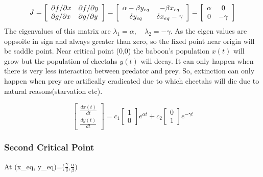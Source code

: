 \documentclass[12pt]{article}
\begin{document}
\begin{equation*}
J = \left[ \begin{array} { l l } \partial f / \partial x & \partial f / \partial y \\ \partial g / \partial x & \partial g / \partial y \end{array} \right] = \left[ \begin{array} { c c } \alpha - \beta y_{eq} & - \beta x_{eq} \\ \delta y_{eq} & \delta x_{eq} - \gamma \end{array} \right] = \left[ \begin{array} { c c } \alpha & 0 \\ 0 & - \gamma \end{array} \right]
    
\end{equation*}
The eigenvalues of this matrix are $ \lambda _ { 1 } = \alpha , \quad \lambda _ { 2 } = - \gamma $. As the eigen values are oppsoite in sign and always greater than zero, so the fixed point near origin will be saddle point. Near critical point (0,0) the baboon's population $ x ( t ) $ will grow but the population of cheetahs $y(t)$ will decay. It can only happen when there is very less interaction between predator and prey. So, extinction can only happen when prey are artifically eradicated due to which cheetahs will die due to natural reasons(starvation etc).

\begin{equation*}
    \left[\begin{array} { c } \frac { d x ( t ) } { d t } \\ \frac { d y ( t ) } { d t } \end{array} \right] = c _ { 1 } \left[ \begin{array} { l } 1 \\ 0 \end{array} \right] e ^ { \alpha t } + c _ { 2 } \left[ \begin{array} { l } 0 \\ 1 \end{array} \right] e ^ { - \gamma t } 
\end{equation*}



\subsubsection*{Second Critical Point}
At (x_{eq}, y_{eq})=($\frac{\gamma}{\delta}$,$\frac{\alpha}{\beta}$) \\
\end{document}
